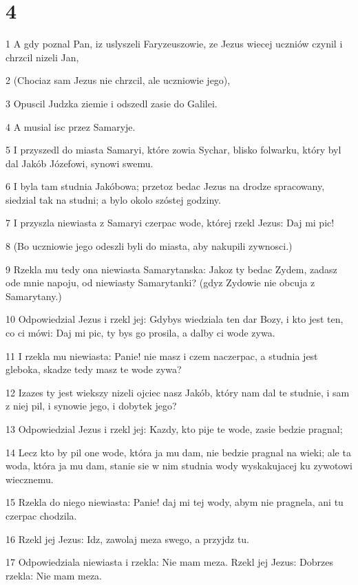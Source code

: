 \chapter{4}

\par 1 A gdy poznal Pan, iz uslyszeli Faryzeuszowie, ze Jezus wiecej uczniów czynil i chrzcil nizeli Jan,
\par 2 (Chociaz sam Jezus nie chrzcil, ale uczniowie jego),
\par 3 Opuscil Judzka ziemie i odszedl zasie do Galilei.
\par 4 A musial isc przez Samaryje.
\par 5 I przyszedl do miasta Samaryi, które zowia Sychar, blisko folwarku, który byl dal Jakób Józefowi, synowi swemu.
\par 6 I byla tam studnia Jakóbowa; przetoz bedac Jezus na drodze spracowany, siedzial tak na studni; a bylo okolo szóstej godziny.
\par 7 I przyszla niewiasta z Samaryi czerpac wode, której rzekl Jezus: Daj mi pic!
\par 8 (Bo uczniowie jego odeszli byli do miasta, aby nakupili zywnosci.)
\par 9 Rzekla mu tedy ona niewiasta Samarytanska: Jakoz ty bedac Zydem, zadasz ode mnie napoju, od niewiasty Samarytanki? (gdyz Zydowie nie obcuja z Samarytany.)
\par 10 Odpowiedzial Jezus i rzekl jej: Gdybys wiedziala ten dar Bozy, i kto jest ten, co ci mówi: Daj mi pic, ty bys go prosila, a dalby ci wode zywa.
\par 11 I rzekla mu niewiasta: Panie! nie masz i czem naczerpac, a studnia jest gleboka, skadze tedy masz te wode zywa?
\par 12 Izazes ty jest wiekszy nizeli ojciec nasz Jakób, który nam dal te studnie, i sam z niej pil, i synowie jego, i dobytek jego?
\par 13 Odpowiedzial Jezus i rzekl jej: Kazdy, kto pije te wode, zasie bedzie pragnal;
\par 14 Lecz kto by pil one wode, która ja mu dam, nie bedzie pragnal na wieki; ale ta woda, która ja mu dam, stanie sie w nim studnia wody wyskakujacej ku zywotowi wiecznemu.
\par 15 Rzekla do niego niewiasta: Panie! daj mi tej wody, abym nie pragnela, ani tu czerpac chodzila.
\par 16 Rzekl jej Jezus: Idz, zawolaj meza swego, a przyjdz tu.
\par 17 Odpowiedziala niewiasta i rzekla: Nie mam meza. Rzekl jej Jezus: Dobrzes rzekla: Nie mam meza.
